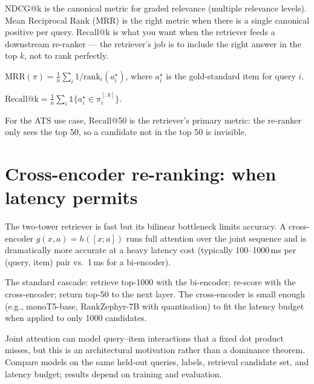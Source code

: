 \documentclass[11pt,oneside]{scrbook}
\begin{document}
NDCG@k is the canonical metric for graded relevance (multiple relevance
levels). Mean Reciprocal Rank (MRR) is the right metric when there is a
single canonical positive per query. Recall@k is what you want when the
retriever feeds a downstream re-ranker --- the retriever's job is to
include the right answer in the top $k$, not to rank perfectly.

\begin{definition}
$\mathrm{MRR}(\pi) = \frac{1}{n} \sum_i 1 / \mathrm{rank}_i(a_i^\star)$,
where $a_i^\star$ is the gold-standard item for query $i$.
\end{definition}

\begin{definition}[Recall@k]
$\mathrm{Recall@k} = \frac{1}{n} \sum_i \mathbb{1}\{a_i^\star \in \pi_i^{[:k]}\}$.
\end{definition}

For the ATS use case, Recall@50 is the retriever's primary metric: the
re-ranker only sees the top 50, so a candidate not in the top 50 is invisible.

\chapter{Cross-encoder re-ranking: when latency permits}

The two-tower retriever is fast but its bilinear bottleneck limits accuracy.
A cross-encoder $g(x, a) = h([x; a])$ runs full attention over the joint
sequence and is dramatically more accurate at a heavy latency cost
(typically 100--1000\,ms per (query, item) pair vs.\ 1\,ms for a
bi-encoder).

The standard cascade: retrieve top-1000 with the bi-encoder; re-score with
the cross-encoder; return top-50 to the next layer. The cross-encoder is
small enough (e.g., monoT5-base, RankZephyr-7B with quantisation) to fit
the latency budget when applied to only 1000 candidates.

\begin{remark}
Joint attention can model query--item interactions that a fixed dot product
misses, but this is an architectural motivation rather than a dominance
theorem. Compare models on the same held-out queries, labels, retrieval
candidate set, and latency budget; results depend on training and evaluation.
\end{remark}
\end{document}
